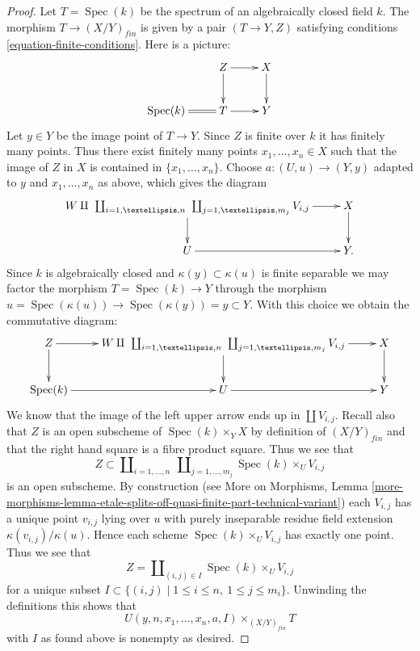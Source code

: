 \documentclass{stacks-project}
\theoremstyle{plain}
\theoremstyle{definition}
\theoremstyle{remark}
\numberwithin{equation}{subsection}
\def\Spec{\mathop{\mathrm{Spec}}}
\begin{document}
\begin{proof}
\medskip\noindent
Let $T = \Spec(k)$ be the spectrum of an algebraically closed
field $k$. The morphism $T \to (X/Y)_{fin}$ is given by a pair
$(T \to Y, Z)$ satisfying conditions \ref{equation-finite-conditions}.
Here is a picture:
$$
\xymatrix{
& Z \ar[d] \ar[r] & X \ar[d] \\
\Spec(k) \ar@{=}[r] & T \ar[r] & Y
}
$$
Let $y \in Y$ be the image point of $T \to Y$.
Since $Z$ is finite over $k$ it has finitely many points.
Thus there exist finitely many points $x_1, \ldots, x_n \in X$
such that the image of $Z$ in $X$ is contained in $\{x_1, \ldots, x_n\}$.
Choose $a : (U, u) \to (Y, y)$ adapted to $y$ and $x_1, \ldots, x_n$ as
above, which gives the diagram
$$
\xymatrix{
W \amalg
\ \coprod\nolimits_{i = 1, \ldots, n}
\ \coprod\nolimits_{j = 1, \ldots, m_j}
V_{i, j} \ar[d] \ar[r] &
X \ar[d] \\
U \ar[r] & Y.
}
$$
Since $k$ is algebraically closed and
$\kappa(y) \subset \kappa(u)$ is finite separable
we may factor the morphism
$T = \Spec(k) \to Y$ through the morphism
$u = \Spec(\kappa(u)) \to \Spec(\kappa(y)) = y \subset Y$.
With this choice we obtain the commutative diagram:
$$
\xymatrix{
Z \ar[d] \ar[r] &
W \amalg
\ \coprod\nolimits_{i = 1, \ldots, n}
\ \coprod\nolimits_{j = 1, \ldots, m_j}
V_{i, j} \ar[d] \ar[r] &
X \ar[d] \\
\Spec(k) \ar[r] &
U \ar[r] & Y
}
$$
We know that the image of the left upper arrow ends up in
$\coprod V_{i, j}$. Recall also that $Z$ is an open subscheme
of $\Spec(k) \times_Y X$ by definition of $(X/Y)_{fin}$
and that the right hand square is a fibre product square.
Thus we see that
$$
Z \subset
\coprod\nolimits_{i = 1, \ldots, n}\ \coprod\nolimits_{j = 1, \ldots, m_j}
\Spec(k) \times_U V_{i, j}
$$
is an open subscheme. By construction (see
More on Morphisms, Lemma
\ref{more-morphisms-lemma-etale-splits-off-quasi-finite-part-technical-variant})
each $V_{i, j}$ has a unique point $v_{i, j}$ lying over $u$
with purely inseparable residue field extension
$\kappa(v_{i, j})/\kappa(u)$. Hence each
scheme $\Spec(k) \times_U V_{i, j}$ has exactly one
point. Thus we see that
$$
Z = \coprod\nolimits_{(i, j) \in I} \Spec(k) \times_U V_{i, j}
$$
for a unique subset
$I \subset \{(i, j) \mid 1 \leq i \leq n, \ 1 \leq j \leq m_i\}$.
Unwinding the definitions this shows that
$$
U(y, n, x_1, \ldots, x_n, a, I) \times_{(X/Y)_{fin}} T
$$
with $I$ as found above is nonempty as desired.
\end{proof}
\end{document}
